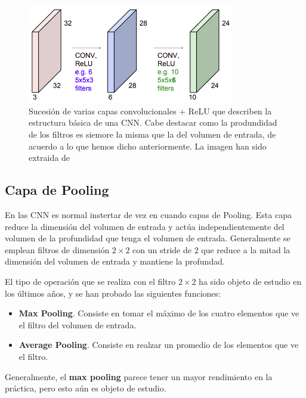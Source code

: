         \begin{figure}[!h]
            \centering
            \includegraphics[width=0.8\textwidth]{img/sucesion_conv_layer.png}
            \caption{Sucesión de varias capas convolucionales + ReLU que describen la estructura básica de una CNN. Cabe destacar como la produndidad de los filtros es siemore la misma que la del volumen de entrada, de acuerdo a lo que hemos dicho anteriormente. La imagen han sido extraida de \cite{StanfordCourse}}
            \label{fig:estructura_convnet}
        \end{figure}

    \subsection{Capa de Pooling}
        \noindent En las CNN es normal instertar de vez en cuando capas de Pooling. Esta capa reduce la dimensión del volumen de entrada y actúa independientemente del volumen de la profundidad que tenga el volumen de entrada. Generalmente se emplean filtros de dimensión $2 \times 2$ con un stride de $2$ que reduce a la mitad la dimensión del volumen de entrada y mantiene la profundad.

        \medskip

        \noindent El tipo de operación que se realiza con el filtro $2 \times 2$ ha sido objeto de estudio en los últimos años, y se han probado las siguientes funciones: 

        \begin{itemize}
            \item \textbf{Max Pooling}. Consiste en tomar el máximo de los cuatro elementos que ve el filtro del volumen de entrada. 
            \item \textbf{Average Pooling}. Consiste en realzar un promedio de los elementos que ve el filtro.
        \end{itemize}

        \noindent Generalmente, el \textbf{max pooling} parece tener un mayor rendimiento en la práctica, pero esto aún es objeto de estudio.

